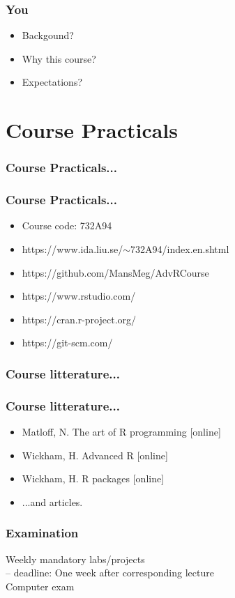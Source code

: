 \documentclass{beamer}
\begin{document}
\begin{frame}
	\frametitle{You}
	\begin{itemize}
		\item Backgound?
		\item Why this course?
		\item Expectations?
	\end{itemize}
\end{frame}

\section{Course Practicals}

\begin{frame}
	\frametitle{Course Practicals...}
\end{frame}

\begin{frame}
	\frametitle{Course Practicals...}
	\begin{itemize}
		\item Course code: 732A94
		\item https://www.ida.liu.se/$\sim$732A94/index.en.shtml
		\item https://github.com/MansMeg/AdvRCourse
		\item https://www.rstudio.com/
		\item https://cran.r-project.org/
		\item https://git-scm.com/
	\end{itemize}
\end{frame}


\begin{frame}
	\frametitle{Course litterature...}
\end{frame}

\begin{frame}
	\frametitle{Course litterature...}
	\begin{itemize}
		\item Matloff, N. The art of R programming [online]
		\item Wickham, H. Advanced R [online]
		\item  Wickham, H. R packages [online]
		\item ...and articles.
	\end{itemize}
\end{frame}


\begin{frame}
	\frametitle{Examination}
	Weekly mandatory labs/projects \\
	-- deadline: One week after corresponding lecture \\
	Computer exam
\end{frame}
\end{document}
